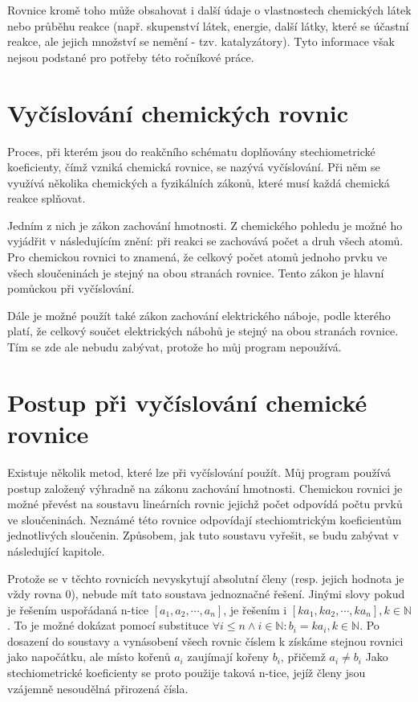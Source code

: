 \documentclass[12pt,a4paper]{report}
\begin{document}
Rovnice kromě toho může obsahovat i další údaje o vlastnostech chemických látek nebo průběhu reakce (např. skupenství látek, energie, další látky, které se účastní reakce, ale jejich množství se nemění - tzv. katalyzátory). Tyto informace však nejsou podstané pro potřeby této ročníkové práce.

\section{Vyčíslování chemických rovnic}
Proces, při kterém jsou do reakčního schématu doplňovány stechiometrické koeficienty, čímž vzniká chemická rovnice, se nazývá vyčíslování. Při něm se využívá několika chemických a fyzikálních zákonů, které musí každá chemická reakce splňovat.

Jedním z nich je zákon zachování hmotnosti. Z chemického pohledu je možné ho vyjádřit v následujícím znění: při reakci se zachovává počet a druh všech atomů. Pro chemickou rovnici to znamená, že celkový počet atomů jednoho prvku ve všech sloučeninách je stejný na obou stranách rovnice. Tento zákon je hlavní pomůckou při vyčíslování.

Dále je možné použít také zákon zachování elektrického náboje, podle kterého platí, že celkový součet elektrických nábohů je stejný na obou stranách rovnice. Tím se zde ale nebudu zabývat, protože ho můj program nepoužívá.

\section{Postup při vyčíslování chemické rovnice}
Existuje několik metod, které lze při vyčíslování použít. Můj program používá postup založený výhradně na zákonu zachování hmotnosti. Chemickou rovnici je možné převést na soustavu lineárních rovnic jejichž počet odpovídá počtu prvků ve sloučeninách. Neznámé této rovnice odpovídají stechiomtrickým koeficientům jednotlivých sloučenin. Způsobem, jak tuto soustavu vyřešit, se budu zabývat v následující kapitole.

Protože se v těchto rovnicích nevyskytují absolutní členy (resp. jejich hodnota je vždy rovna 0), nebude mít tato soustava jednoznačné řešení. Jinými slovy pokud je řešením 
uspořádaná n-tice $ [a_1, a_2, \cdots, a_n] $, je řešením i $ [ka_1, ka_2, \cdots, ka_n], k \in \mathbb{N} $. To je možné dokázat pomocí substituce $ \forall i \leq n \wedge i \in \mathbb{N}: b_i = ka_i, k \in \mathbb{N} $. Po dosazení do soustavy a vynásobení všech rovnic číslem k získáme stejnou rovnici jako napočátku, ale místo kořenů $ a_i $ zaujímají kořeny $ b_i $, přičemž $ a_i \neq b_i $ Jako stechiometrické koeficienty se proto použije taková n-tice, jejíž členy jsou vzájemně nesoudělná přirozená čísla.
\end{document}
